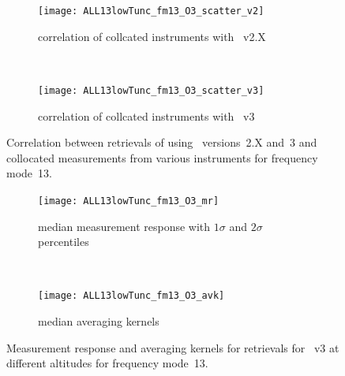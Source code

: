 \begin{figure}[tbhp]
    \centering
    \begin{subfigure}[b]{0.49\textwidth}
        \texttt{[image: ALL13lowTunc\_fm13\_O3\_scatter\_v2]}
        \caption{correlation of collcated instruments with \smr~v2.X}
        \label{fig:fm13:O3:scatter:v2}
    \end{subfigure}
    \,
    \begin{subfigure}[b]{0.49\textwidth}
        \texttt{[image: ALL13lowTunc\_fm13\_O3\_scatter\_v3]}
        \caption{correlation of collcated instruments with \smr~v3}
        \label{fig:fm13:O3:scatter:v3}
    \end{subfigure}
    \caption{Correlation between retrievals of  using \smr\
    versions~2.X and~3 and collocated measurements from various instruments
    for frequency mode~13.}
    \label{fig:fm13:O3:scatter}
\end{figure}

\begin{figure}[tbhp]
    \centering
    \begin{subfigure}[b]{0.49\textwidth}
        \texttt{[image: ALL13lowTunc\_fm13\_O3\_mr]}
        \caption{median measurement response with $1\sigma$ and $2\sigma$
        percentiles}
        \label{fig:fm13:O3:mr}
    \end{subfigure}
    \,
    \begin{subfigure}[b]{0.49\textwidth}
        \texttt{[image: ALL13lowTunc\_fm13\_O3\_avk]}
        \caption{median averaging kernels\newline~}
        \label{fig:fm13:O3:avk}
    \end{subfigure}
    \caption{Measurement response and averaging kernels for 
    retrievals for \smr~v3 at different altitudes for frequency mode~13.}
    \label{fig:fm13:O3:mr_avk}
\end{figure}


\newpage
